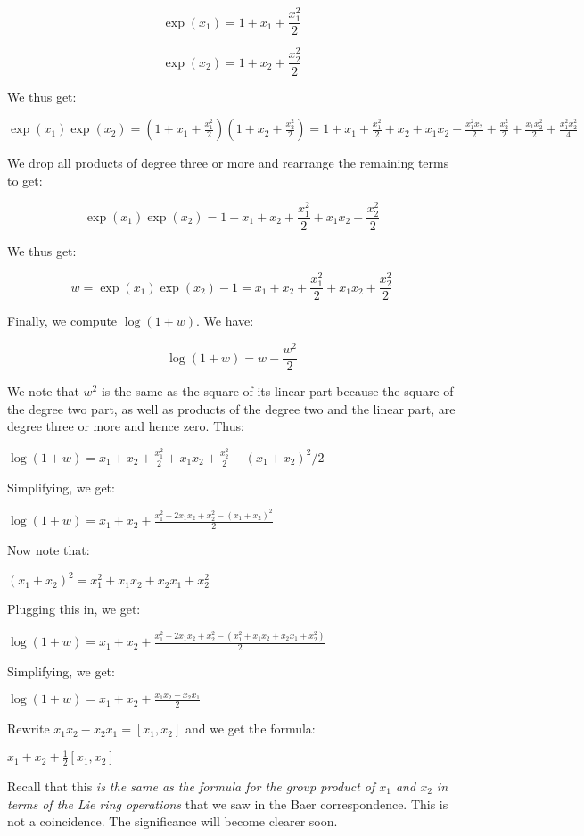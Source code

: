 \documentclass{ucetd}
\begin{document}
$$ \exp(x_1) = 1 + x_1 + \frac{x_1^2}{2}$$

$$ \exp(x_2) = 1 + x_2 + \frac{x_2^2}{2}$$

We thus get:

$\exp(x_1)\exp(x_2) = \left(1 + x_1 + \frac{x_1^2}{2}\right)\left(1 + x_2 + \frac{x_2^2}{2}\right) = 1 + x_1 + \frac{x_1^2}{2} + x_2 + x_1x_2 + \frac{x_1^2x_2}{2} + \frac{x_2^2}{2} + \frac{x_1x_2^2}{2} + \frac{x_1^2x_2^2}{4}$

We drop all products of degree three or more and rearrange the remaining terms to get:

$$ \exp(x_1)\exp(x_2) = 1 + x_1 + x_2 + \frac{x_1^2}{2} + x_1x_2 + \frac{x_2^2}{2}$$

We thus get:

$$ w = \exp(x_1)\exp(x_2) - 1 = x_1 + x_2 + \frac{x_1^2}{2} + x_1x_2 + \frac{x_2^2}{2}$$

Finally, we compute $\log(1 + w)$. We have:

$$\log(1 + w) = w - \frac{w^2}{2}$$

We note that $w^2$ is the same as the square of its linear part
because the square of the degree two part, as well as products of the
degree two and the linear part, are degree three or more and hence
zero. Thus:

$\log(1 + w) = x_1 + x_2 + \frac{x_1^2}{2} + x_1x_2 + \frac{x_2^2}{2} - (x_1 + x_2)^2/2$

Simplifying, we get:

$\log(1 + w) = x_1 + x_2 + \frac{x_1^2 + 2x_1x_2 + x_2^2 - (x_1 + x_2)^2}{2}$

Now note that:

$ (x_1 + x_2)^2 = x_1^2 + x_1x_2 + x_2x_1 + x_2^2$

Plugging this in, we get:

$\log(1 + w) = x_1 + x_2 + \frac{x_1^2 + 2x_1x_2 + x_2^2 - (x_1^2 + x_1x_2 + x_2x_1 + x_2^2)}{2}$

Simplifying, we get:

$\log(1 + w) = x_1 + x_2 + \frac{x_1x_2 - x_2x_1}{2}$

Rewrite $x_1x_2 - x_2x_1 = [x_1,x_2]$ and we get the formula:

$ x_1 + x_2 + \frac{1}{2}[x_1,x_2]$

Recall that this {\em is the same as the formula for the group product
  of $x_1$ and $x_2$ in terms of the Lie ring operations} that we saw
in the Baer correspondence. This is not a coincidence. The
significance will become clearer soon.
\end{document}
